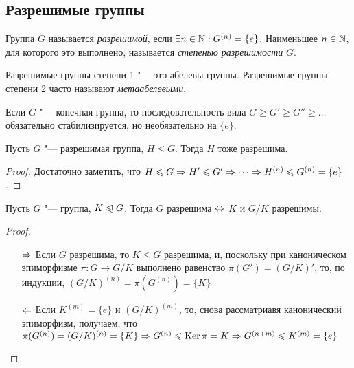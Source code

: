 \subsection{Разрешимые группы}

\begin{definition}
	Группа $G$ называется \textit{разрешимой}, если $\exists n \hm\in \N: G^{(n)} = \{e\}$. Наименьшее $n \in \mathbb{N}$, для которого это выполнено, называется \textit{степенью разрешимости} $G$.
\end{definition}

\begin{note}
	Разрешимые группы степени 1 "--- это абелевы группы. Разрешимые группы степени 2 часто называют \textit{метаабелевыми}.
\end{note}

\begin{note}
	Если $G$ "--- конечная группа, то последовательность вида $G \ge G' \ge G'' \ge \dotsc$ обязательно стабилизируется, но необязательно на $\{e\}$.
\end{note}

\begin{proposition}
	Пусть $G$ "--- разрешимая группа, $H \le G$. Тогда $H$ тоже разрешима.
\end{proposition}

\begin{proof}
	Достаточно заметить, что $H \le G \ra H' \le G' \hm\ra \dotsb \ra H^{(n)} \le G^{(n)} \hm= \{e\}$.
\end{proof}

\begin{theorem}
	Пусть $G$ "--- группа, $K \trianglelefteqslant G$. Тогда $G$ разрешима $\Leftrightarrow$ $K$ и $G / K$ разрешимы.
\end{theorem}

\begin{proof}~
	\begin{itemize}
		\item[$\Rightarrow$] Если $G$ разрешима, то $K \le G$ разрешима, и, поскольку при каноническом эпиморфизме $\pi: G \to G/K$ выполнено равенство $\pi(G') = (G / K)'$, то, по индукции, $(G / K)^{(n)} = \pi(G^{(n)}) = \{K\}$
		\item[$\Leftarrow$] Если $K^{(m)} = \{e\}$ и $(G / K)^{(m)}$, то, снова рассматриавя канонический эпиморфизм, получаем, что $\pi(G^{(n)}) = (G / K)^{(n)} \hm= \{K\} \ra G^{(n)} \le \ke\pi = K \ra G^{(n + m)} \le K^{(m)} \hm= \{e\}$
	\end{itemize}
\end{proof}

